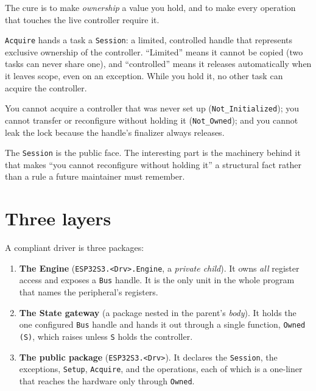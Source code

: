 The cure is to make \emph{ownership} a value you hold, and to make every operation
that touches the live controller require it.

\begin{description}[style=nextline]
\item[A \texttt{Session} is a capability.] \texttt{Acquire} hands a task a
  \texttt{Session}: a limited, controlled handle that represents exclusive
  ownership of the controller. ``Limited'' means it cannot be copied (two tasks
  can never share one), and ``controlled'' means it releases automatically when it
  leaves scope, even on an exception. While you hold it, no other task can
  acquire the controller.
\item[Three things become impossible.] You cannot acquire a controller that was
  never set up (\texttt{Not\_Initialized}); you cannot transfer or reconfigure
  without holding it (\texttt{Not\_Owned}); and you cannot leak the lock because
  the handle's finalizer always releases.
\end{description}

The \texttt{Session} is the public face. The interesting part is the machinery
behind it that makes ``you cannot reconfigure without holding it'' a structural
fact rather than a rule a future maintainer must remember.

\section{Three layers}

A compliant driver is three packages:

\begin{enumerate}
\item \textbf{The Engine} (\texttt{ESP32S3.<Drv>.Engine}, a \emph{private child}).
  It owns \emph{all} register access and exposes a \texttt{Bus} handle. It is the
  only unit in the whole program that names the peripheral's registers.
\item \textbf{The State gateway} (a package nested in the parent's \emph{body}). It
  holds the one configured \texttt{Bus} handle and hands it out through a single
  function, \texttt{Owned (S)}, which raises unless \texttt{S} holds the
  controller.
\item \textbf{The public package} (\texttt{ESP32S3.<Drv>}). It declares the
  \texttt{Session}, the exceptions, \texttt{Setup}, \texttt{Acquire}, and the
  operations, each of which is a one-liner that reaches the hardware only
  through \texttt{Owned}.
\end{enumerate}

